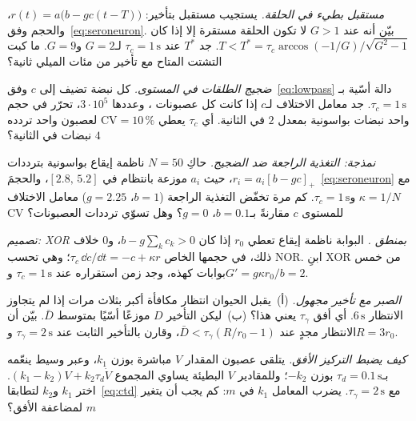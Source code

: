\begin{exercise}[\lvlB]
\label{ex:05:3}
\emph{مستقبل بطيء في الحلقة.} يستجيب مستقبل  بتأخير: $r(t)=a\bigl(b-gc(t-T)\bigr)$، والحجم وفق~\eqref{eq:seroneuron}. بيّن أنه عند $G>1$ لا تكون الحلقة مستقرة إلا إذا كان $T<T^*=\tau_c\arccos(-1/G)/\sqrt{G^2-1}$. جد $T^*$ عند $\tau_c=1\,\text{s}$ لـ$G=2$ و$G=9$. ما كبت التشتت المتاح مع تأخير من مئات الميلي ثانية؟
\end{exercise}

\begin{exercise}[\lvlB]
\label{ex:05:4}
\emph{ضجيج الطلقات في المستوى.} كل نبضة تضيف إلى $c$ وفق~\eqref{eq:lowpass} دالة أسّية بـ$\tau_c=1\,\text{s}$. جد معامل الاختلاف لـ$c$ إذا كانت كل عصبونات ، وعددها $3\cdot10^5$، تحرّر في حجم واحد نبضات بواسونية بمعدل $2$ في الثانية. أي $\tau_c$ يعطي $\mathrm{CV}=10\,\%$ لعصبون واحد تردده $4$ نبضات في الثانية؟
\end{exercise}

\begin{exercise}[\lvlB]
\label{ex:05:5}
\emph{نمذجة: التغذية الراجعة ضد الضجيج.} حاكِ $N=50$ ناظمة إيقاع بواسونية بترددات $r_i=a_i[b-gc]_+$، حيث $a_i$ موزعة بانتظام في $[2.8,\,5.2]$، والحجمَ~\eqref{eq:seroneuron} مع $\kappa=1/N$ و$\tau_c=1\,\text{s}$. كم مرة تخفّض التغذية الراجعة ($b=1$، $g=2.25$) معامل الاختلاف \foreignlanguage{english}{CV} للمستوى $c$ مقارنةً بـ$b=0.1$، $g=0$؟ وهل تسوّي ترددات العصبونات؟
\end{exercise}

\begin{exercise}[\lvlB]
\label{ex:05:6}
\emph{تصميم: \foreignlanguage{english}{XOR} بمنطق .} البوابة ناظمة إيقاع تعطي $r_0$ إذا كان $b-g\sum_kc_k>0$، و$0$ خلاف ذلك، في حجمها الخاص $\tau_c\,\dd c/\dd t=-c+\kappa r$؛ وهي تحسب \foreignlanguage{english}{NOR}. ابنِ \foreignlanguage{english}{XOR} من خمس بوابات كهذه، وجد زمن استقراره عند $\tau_c=1\,\text{s}$ و$G'=g\kappa r_0/b=2$.
\end{exercise}

\begin{exercise}[\lvlB]
\label{ex:05:7}
\emph{الصبر مع تأخير مجهول.} (أ)~يقبل الحيوان انتظار مكافأة أكبر بثلاث مرات إذا لم يتجاوز الانتظار $6\,\text{s}$. أي أفق $\tau_\gamma$ يعني هذا؟ (ب)~ليكن التأخير $D$ موزعًا أسّيًا بمتوسط $\bar D$. بيّن أن الانتظار مجدٍ عند $\bar D<\tau_\gamma(R/r_0-1)$، وقارن بالتأخير الثابت عند $\tau_\gamma=2\,\text{s}$ و$R=3r_0$.
\end{exercise}

\begin{exercise}[\lvlC]
\label{ex:05:8}
\emph{كيف يضبط التركيز الأفق.} يتلقى عصبون  المقدار $V$ مباشرة بوزن $k_1$، وعبر وسيط  ينعّمه بـ$\tau_d=0.1\,\text{s}$ بوزن $-k_2$؛ وللمقادير $V$ البطيئة يساوي المجموع $(k_1-k_2)V+k_2\tau_d\dot V$. اختر $k_1$ و$k_2$ لتطابقا~\eqref{eq:ctd} مع $\tau_\gamma=2\,\text{s}$. يضرب  المعامل $k_1$ في $m$: كم يجب أن يتغير $m$ لمضاعفة الأفق؟
\end{exercise}
